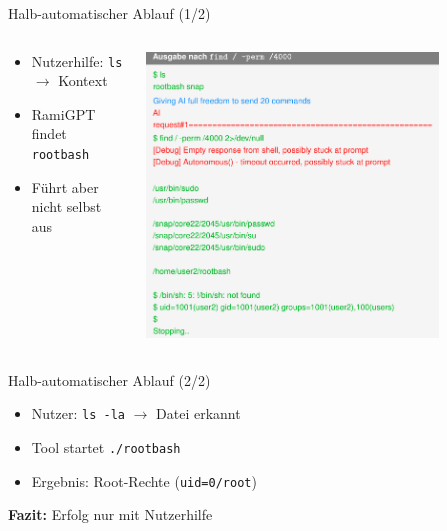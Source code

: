 \documentclass[
	aspectratio=169,	%
	onlytextwidth,		%
	t,					%
	]{beamer}
\begin{document}
\begin{frame}{Halb-automatischer Ablauf (1/2)}
	\begin{columns}
		\begin{column}[T]{.45\textwidth}
			\begin{itemize}
				\item Nutzerhilfe: \texttt{ls} $\rightarrow$ Kontext
				\item RamiGPT findet \texttt{rootbash}
				\item Führt aber nicht selbst aus
			\end{itemize}
		\end{column}
		\begin{column}[T]{.55\textwidth}
			\centering
			\vspace{-8mm}
			\includegraphics[width=0.8\textwidth]{figures/11.png}
			\label{fig:11}
		\end{column}
	\end{columns}
\end{frame}


\begin{frame}{Halb-automatischer Ablauf (2/2)}
	\begin{itemize}
			\item Nutzer: \texttt{ls -la} $\rightarrow$ Datei erkannt
			\item Tool startet \texttt{./rootbash}
			\item Ergebnis: Root-Rechte (\texttt{uid=0/root})
	\end{itemize}
	\textbf{Fazit:} Erfolg nur mit Nutzerhilfe
\end{frame}
\end{document}
